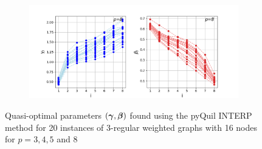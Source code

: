 \begin{figure}[H]
\begin{subfigure}[t]{0.7\textwidth}
	\end{subfigure}
	\\
	\centering
	\begin{subfigure}[t]{0.7\textwidth}
		\centering
		\includegraphics[width=\textwidth]{figures/interp/patterns/pattern_16-nodal_p-8_weighted.png}
	\end{subfigure}
	\caption{Quasi-optimal parameters $(\bm{\gamma},\bm{\beta})$ found using the pyQuil INTERP method for 20 instances of 3-regular weighted graphs with 16 nodes for $p = 3, 4, 5$ and $8$}
	\label{fig:appendix-patterns-12-nodal-3-regular}
\end{figure}

